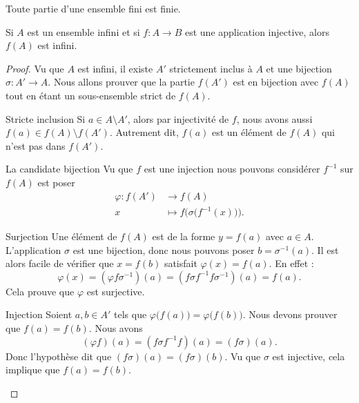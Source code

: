 \begin{lemma}       \label{LEMooTUIRooEXjfDY}
    Toute partie d'une ensemble fini est finie.
\end{lemma}

\begin{lemma}        \label{LEMooXPSQooRaSrxv}
    Si \( A\) est un ensemble infini et si \( f\colon A\to B\) est une application injective, alors \( f(A)\) est infini.
\end{lemma}

\begin{proof}
    Vu que \( A\) est infini, il existe \( A'\) strictement inclus à \( A\) et une bijection \( \sigma\colon A'\to A\). Nous allons prouver que la partie \( f(A')\) est en bijection avec \( f(A)\) tout en étant un sous-ensemble strict de \( f(A)\).

    \begin{subproof}
        \item[Stricte inclusion]
            Si \( a\in A\setminus A'\), alors par injectivité de \( f\), nous avons aussi \( f(a)\in f(A)\setminus f(A')\). Autrement dit, \( f(a)\) est un élément de \( f(A)\) qui n'est pas dans \( f(A')\).
        \item[La candidate bijection]
            Vu que \( f\) est une injection nous pouvons considérer \( f^{-1}\) sur \( f(A)\) est poser
            \begin{equation}
                \begin{aligned}
                    \varphi\colon f(A')&\to f(A) \\
                    x&\mapsto  f\Big( \sigma\big( f^{-1}(x) \big) \Big).
                \end{aligned}
            \end{equation}
        \item[Surjection]
            Une élément de \( f(A)\) est de la forme \( y=f(a)\) avec \( a\in A\). L'application \( \sigma\) est une bijection, donc nous pouvons poser \( b=\sigma^{-1}(a)\). Il est alors facile de vérifier que \( x=f(b)\) satisfait \( \varphi(x)=f(a)\). En effet :
            \begin{equation}
                \varphi(x)=(\varphi f\sigma^{-1})(a)=(f\sigma f^{-1}f\sigma^{-1})(a)=f(a).
            \end{equation}
            Cela prouve que \( \varphi\) est surjective.
        \item[Injection]
            Soient \( a,b\in A'\) tels que \( \varphi\big( f(a) \big)=\varphi\big( f(b) \big)\). Nous devons prouver que \( f(a)=f(b)\). Nous avons
            \begin{equation}
                (\varphi f)(a)=(f\sigma f^{-1} f)(a)=(f\sigma)(a).
            \end{equation}
            Donc l'hypothèse dit que \( (f\sigma)(a)=(f\sigma)(b)\). Vu que \( \sigma\) est injective, cela implique que \( f(a)=f(b)\).
    \end{subproof}
\end{proof}

